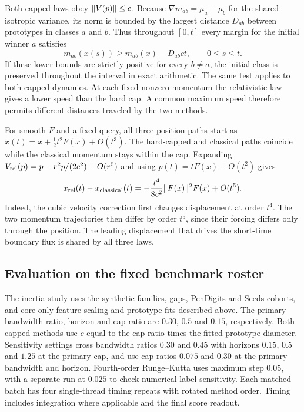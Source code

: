 Both capped laws obey $\lVert V(p)\rVert\le c$. Because
$\nabla m_{ab}=\mu_a-\mu_b$ for the shared isotropic variance, its norm
is bounded by the largest distance $D_{ab}$ between prototypes in classes
$a$ and $b$. Thus throughout $[0,t]$ every margin for the initial winner
$a$ satisfies
\begin{equation}
  m_{ab}(x(s))\ge m_{ab}(x)-D_{ab}ct,\qquad 0\le s\le t .
  \label{eq:capped-preservation}
\end{equation}
If these lower bounds are strictly positive for every $b\ne a$, the initial
class is preserved throughout the interval in exact arithmetic. The same
test applies to both capped dynamics. At each fixed nonzero momentum the
relativistic law gives a lower speed than the hard cap. A common maximum
speed therefore permits different distances traveled by the two methods.

For smooth $F$ and a fixed query, all three position paths start as
$x(t)=x+\frac12t^2F(x)+O(t^3)$. The hard-capped and classical paths coincide
while the classical momentum stays within the cap. Expanding
$V_{\rm rel}(p)=p-r^2p/(2c^2)+O(r^5)$ and using $p(t)=tF(x)+O(t^2)$ gives
\begin{equation}
  x_{\rm rel}(t)-x_{\rm classical}(t)
    =-\frac{t^4}{8c^2}\lVert F(x)\rVert^2F(x)+O(t^5).
  \label{eq:relativistic-short-time}
\end{equation}
Indeed, the cubic velocity correction first changes displacement at order
$t^4$. The two momentum trajectories then differ by order $t^5$, since
their forcing differs only through the position. The leading displacement
that drives the short-time boundary flux is shared by all three laws.

\subsection{Evaluation on the fixed benchmark roster}

The inertia study uses the synthetic families, gaps, PenDigits and Seeds
cohorts, and core-only feature scaling and prototype fits described above.
The primary bandwidth ratio, horizon and cap ratio are $0.30$, $0.5$ and
$0.15$, respectively. Both capped methods use $c$ equal to the cap ratio
times the fitted prototype diameter. Sensitivity settings cross bandwidth
ratios $0.30$ and $0.45$ with horizons $0.15$, $0.5$ and $1.25$ at the
primary cap, and use cap ratios $0.075$ and $0.30$ at the primary bandwidth
and horizon. Fourth-order Runge--Kutta uses maximum step $0.05$, with a
separate run at $0.025$ to check numerical label sensitivity. Each matched
batch has four single-thread timing repeats with rotated method order.
Timing includes integration where applicable and the final score readout.

